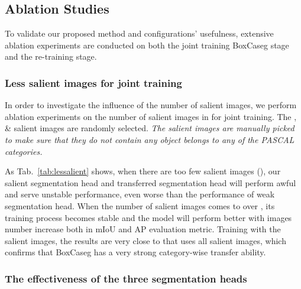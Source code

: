 \documentclass[final]{cvpr}
\begin{document}
\vspace{-1mm}
\subsection{Ablation Studies}
\vspace{-1mm}

To validate our proposed method and configurations' usefulness, extensive ablation experiments are conducted on both the joint training BoxCaseg stage and the re-training stage. 

\vspace{-3mm}
\subsubsection{Less salient images for joint training}
\vspace{-1mm}

In order to investigate the influence of the number of salient images, we perform ablation experiments on the number of salient images in  for joint training. The , \&  salient images are randomly selected. \textit{The  salient images are manually picked to make sure that they do not contain any object belongs to any of the  PASCAL categories.}


As Tab.~\ref{tab:lessalient} shows, when there are too few salient images (), our salient segmentation head and transferred segmentation head will perform awful and serve unstable performance, even worse than the performance of weak segmentation head. When the number of salient images comes to over , its training process becomes stable and the model will perform better with images number increase both in mIoU and AP evaluation metric. Training with the  salient images, the results are very close to that uses all salient images, which confirms that BoxCaseg has a very strong category-wise transfer ability.





\vspace{-3mm}
\subsubsection{The effectiveness of the three segmentation heads}
\vspace{-1mm}
\end{document}
